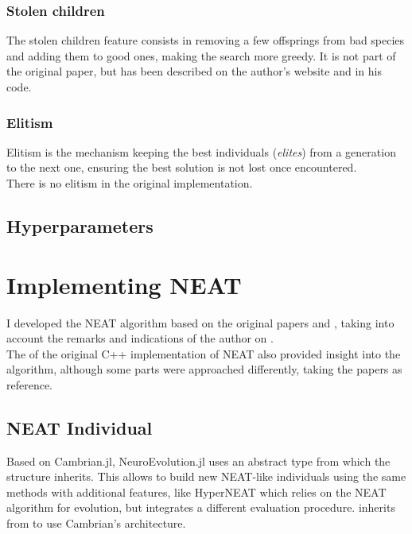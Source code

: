 \subsubsection{Stolen children}
The stolen children feature consists in removing a few offsprings from bad species and adding them to good ones, making the search more greedy. It is not part of the original paper, but has been described on the author's website and in his code.

\subsubsection{Elitism}
Elitism is the mechanism keeping the best individuals (\textit{elites}) from a generation to the next one, ensuring the best solution is not lost once encountered. \\
There is no elitism in the original implementation.

\subsection{Hyperparameters}


\section{Implementing NEAT}
I developed the NEAT algorithm based on the original papers \cite{NEAT_1} and \cite{NEAT_2}, taking into account the remarks and indications of the author on . \\
The  of the original C++ implementation of NEAT also provided insight into the algorithm, although some parts were approached differently, taking the papers as reference.

\subsection{NEAT Individual}

Based on Cambrian.jl, NeuroEvolution.jl uses an abstract type  from which the structure  inherits. This allows to build new NEAT-like individuals using the same methods with additional features, like HyperNEAT which relies on the NEAT algorithm for evolution, but integrates a different evaluation procedure.  inherits from  to use Cambrian's architecture.

